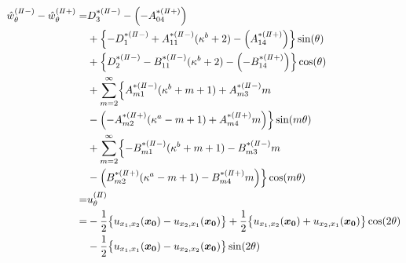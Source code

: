 \begin{align}
	\hat{w}_{\theta}^{(I\hspace{-.15em}I-)}-\hat{w}_{\theta}^{(I\hspace{-.15em}I+)} =&D_{3}^{*(I\hspace{-.15em}I-)}-\Bigl(-A_{04}^{*(I\hspace{-.15em}I+)}\Bigr)
	\nonumber
	\\
	&+\Bigl\{-D_{1}^{*(I\hspace{-.15em}I-)}+A_{11}^{*(I\hspace{-.15em}I-)}(\kappa^{b}+2)
	-\Bigl(A_{14}^{*(I\hspace{-.15em}I+)}\Bigr)\Bigr\}\sin(\theta)
	\nonumber
	\\
	&+\Bigl\{D_{2}^{*(I\hspace{-.15em}I-)}-B_{11}^{*(I\hspace{-.15em}I-)}(\kappa^{b}+2)
	-\Bigl(-B_{14}^{*(I\hspace{-.15em}I+)}\Bigr)\Bigr\}\cos(\theta)
	\nonumber
	\\
	&+\sum_{m=2}^{\infty}\Bigl\{A_{m1}^{*(I\hspace{-.15em}I-)}(\kappa^{b}+m+1)
	+A_{m3}^{*(I\hspace{-.15em}I-)}m
	\nonumber
	\\
	&-\Bigl(-A_{m2}^{*(I\hspace{-.15em}I+)}(\kappa^{a}-m+1)
	+A_{m4}^{*(I\hspace{-.15em}I+)}m\Bigr)\Bigr\}\sin(m\theta)
	\nonumber
	\\
	&+\sum_{m=2}^{\infty}\Bigl\{-B_{m1}^{*(I\hspace{-.15em}I-)}(\kappa^{b}+m+1)
	-B_{m3}^{*(I\hspace{-.15em}I-)}m
	\nonumber
	\\
	&-\Bigl(B_{m2}^{*(I\hspace{-.15em}I+)}(\kappa^{a}-m+1)
	-B_{m4}^{*(I\hspace{-.15em}I+)}m\Bigr)\Bigr\}\cos(m\theta)
	\nonumber
	\\
	=&u_{\theta}^{(I\hspace{-.15em}I)}
	\nonumber
	\\
	=&-\frac{1}{2}\bigl\{u_{x_{1},x_{2}}(\bm{x_{0}})-u_{x_{2},x_{1}}(\bm{x_{0}})\bigr\}
	+\frac{1}{2}\bigl\{u_{x_{1},x_{2}}(\bm{x_{0}})+u_{x_{2},x_{1}}(\bm{x_{0}})\bigr\}\cos(2\theta)
	\nonumber
	\\
	&-\frac{1}{2}\bigl\{u_{x_{1},x_{1}}(\bm{x_{0}})-u_{x_{2},x_{2}}(\bm{x_{0}})\bigr\}\sin(2\theta)
	\label{eq:UTh2eq}
\end{align}

